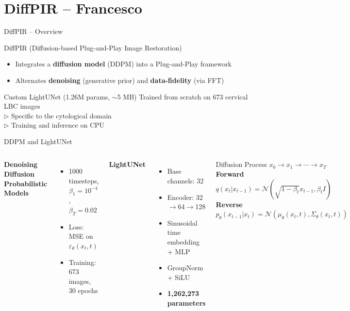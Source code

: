 \documentclass[english,10pt]{beamer}
\begin{document}
\section{DiffPIR -- Francesco}

\begin{frame}{DiffPIR -- Overview}
  \begin{block}{DiffPIR (Diffusion-based Plug-and-Play Image Restoration)}
    \begin{itemize}
      \item Integrates a \textbf{diffusion model} (DDPM) into a Plug-and-Play framework
      \item Alternates \textbf{denoising} (generative prior) and \textbf{data-fidelity} (via FFT)
    \end{itemize}
  \end{block}
  \begin{alertblock}{Custom LightUNet (1.26M params, $\sim$5 MB)}
    Trained from scratch on 673 cervical LBC images\\[0.1cm]
    $\triangleright$ Specific to the cytological domain \\[0.1cm]
    $\triangleright$ Training and inference on CPU
  \end{alertblock}
\end{frame}

\begin{frame}{DDPM and LightUNet}
  \begin{columns}
      \textbf{Denoising Diffusion Probabilistic Models}
      \begin{itemize}\small
        \item 1000 timesteps, $\beta_1=10^{-4}$, $\beta_T=0.02$
        \item Loss: MSE on $\varepsilon_\theta(x_t,t)$
        \item Training: 673 images, 30 epochs
      \end{itemize}
      \vspace{0.2cm}
      \textbf{LightUNet}
      \begin{itemize}\small
        \item Base channels: 32
        \item Encoder: 32$\to$64$\to$128
        \item Sinusoidal time embedding + MLP
        \item GroupNorm + SiLU
        \item \textbf{1,262,273 parameters}
      \end{itemize}
      \begin{block}{Diffusion Process}
        \centering\small
        $x_0 \to x_1 \to \cdots \to x_T$ \\[0.1cm]
        \textbf{Forward} \\
        $q(x_t|x_{t-1}) = \mathcal{N}(\sqrt{1-\beta_t}x_{t-1}, \beta_t I)$ \\[0.2cm]
        \textbf{Reverse} \\
        $p_\theta(x_{t-1}|x_t) = \mathcal{N}(\mu_\theta(x_t,t), \Sigma_\theta(x_t,t))$
      \end{block}
  \end{columns}
\end{frame}
\end{document}
